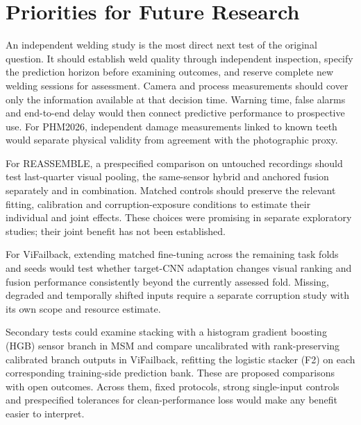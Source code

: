 \section{Priorities for Future Research}
An independent welding study is the most direct next test of the original question. It
should establish weld quality through independent inspection, specify the prediction
horizon before examining outcomes, and reserve complete new welding sessions for
assessment. Camera and process measurements should cover only the information available
at that decision time. Warning time, false alarms and end-to-end delay would then
connect predictive performance to prospective use. For PHM2026, independent damage
measurements linked to known teeth would separate physical validity from agreement with
the photographic proxy.

For REASSEMBLE, a prespecified comparison on untouched recordings should test
last-quarter visual pooling, the same-sensor hybrid and anchored fusion separately and
in combination. Matched controls should preserve the relevant fitting, calibration and
corruption-exposure conditions to estimate their individual and joint effects. These
choices were promising in separate exploratory studies; their joint benefit has not
been established.

For ViFailback, extending matched fine-tuning across the remaining task folds and seeds
would test whether target-CNN adaptation changes visual ranking and fusion performance
consistently beyond the currently assessed fold. Missing, degraded and temporally
shifted inputs require a separate corruption study with its own scope and resource
estimate.

Secondary tests could examine stacking with a histogram gradient boosting (HGB) sensor branch in MSM and compare uncalibrated with
rank-preserving calibrated branch outputs in ViFailback, refitting the logistic stacker (F2) on each
corresponding training-side prediction bank. These are proposed comparisons with open
outcomes. Across them, fixed protocols, strong single-input controls and prespecified
tolerances for clean-performance loss would make any benefit easier to interpret.
